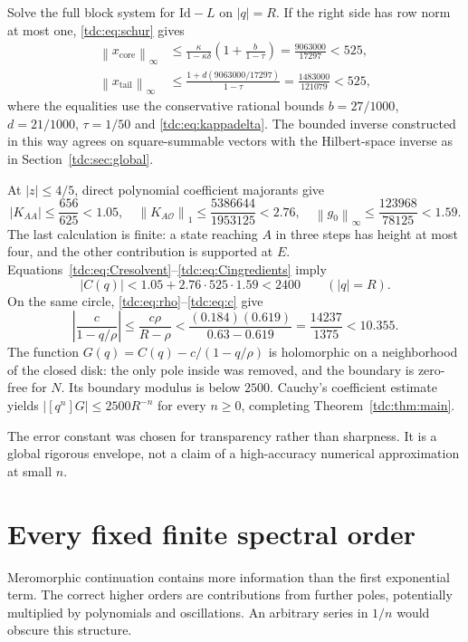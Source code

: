 \documentclass[11pt]{article}
\theoremstyle{definition}\newtheorem{definition}[theorem]{Definition}
\theoremstyle{remark}\newtheorem{remark}[theorem]{Remark}
\newcommand{\Id}{\mathrm{Id}}
\newcommand{\OO}{\mathcal O}
\newcommand{\norm}[1]{\left\lVert#1\right\rVert}
\begin{document}
Solve the full block system for $\Id-L$ on $|q|=R$. If the right side has row norm at most one, \eqref{tdc:eq:schur} gives
\begin{align*}
 \norm{x_{\mathrm{core}}}_\infty
 &\le\frac{\kappa}{1-\kappa\delta}
 \left(1+\frac b{1-\tau}\right)
 =\frac{9063000}{17297}<525,\\
 \norm{x_{\mathrm{tail}}}_\infty
 &\le\frac{1+d(9063000/17297)}{1-\tau}
 =\frac{1483000}{121079}<525,
\end{align*}
where the equalities use the conservative rational bounds
$b=27/1000$, $d=21/1000$, $\tau=1/50$ and \eqref{tdc:eq:kappadelta}.
The bounded inverse constructed in this way agrees on square-summable vectors with the Hilbert-space inverse as in Section~\ref{tdc:sec:global}.

At $|z|\le4/5$, direct polynomial coefficient majorants give
\begin{equation}\label{tdc:eq:Cingredients}
 |K_{AA}|\le\frac{656}{625}<1.05,\quad
 \norm{K_{A\OO}}_1\le\frac{5386644}{1953125}<2.76,\quad
 \norm{g_0}_\infty\le\frac{123968}{78125}<1.59.
\end{equation}
The last calculation is finite: a state reaching $A$ in three steps has height at most four, and the other contribution is supported at $E$. Equations~\eqref{tdc:eq:Cresolvent}--\eqref{tdc:eq:Cingredients} imply
\[
 |C(q)|<1.05+2.76\cdot525\cdot1.59<2400\qquad(|q|=R).
\]
On the same circle, \eqref{tdc:eq:rho}--\eqref{tdc:eq:c} give
\[
 \left|\frac c{1-q/\rho}\right|
 \le\frac{c\rho}{R-\rho}
 <\frac{(0.184)(0.619)}{0.63-0.619}
 =\frac{14237}{1375}<10.355.
\]
The function $G(q)=C(q)-c/(1-q/\rho)$ is holomorphic on a neighborhood of the closed disk: the only pole inside was removed, and the boundary is zero-free for $N$. Its boundary modulus is below $2500$. Cauchy's coefficient estimate yields
$|[q^n]G|\le2500R^{-n}$ for every $n\ge0$, completing Theorem~\ref{tdc:thm:main}.

The error constant was chosen for transparency rather than sharpness. It is a global rigorous envelope, not a claim of a high-accuracy numerical approximation at small $n$.

\section{Every fixed finite spectral order}
\label{tdc:sec:spectral}
Meromorphic continuation contains more information than the first exponential term. The correct higher orders are contributions from further poles, potentially multiplied by polynomials and oscillations. An arbitrary series in $1/n$ would obscure this structure.
\end{document}

